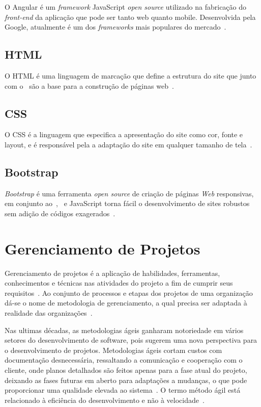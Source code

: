 O Angular é um \textit{framework} JavaScript \textit{open source} utilizado na fabricação do \textit{front-end} da aplicação que pode ser tanto web quanto mobile. 
Desenvolvida pela Google, atualmente é um dos \textit{frameworks} mais populares do mercado~\citep{costa2017email}.

\subsection{HTML}\label{html}
\indent

O \acf{HTML} é uma linguagem de marcação que define a estrutura do site que junto com o~ são a base para a construção de páginas web~\citep{w3c}.

\subsection{CSS}\label{css}
\indent

O \acf{CSS} é a linguagem que especifica a apresentação do site como cor, fonte e layout, e é responsável pela a adaptação do site em qualquer tamanho de tela~\citep{w3c}.

\subsection{Bootstrap}\label{bootstrap}
\indent

\textit{Bootstrap} é uma ferramenta \textit{open source} de criação de páginas \textit{Web} responsivas, em conjunto ao~,~ e JavaScript torna fácil o desenvolvimento de sites robustos sem adição de códigos exagerados~\citep{2013bootstrap}.


\section{Gerenciamento de Projetos}\label{GerProj}
\indent

Gerenciamento de projetos é a aplicação de habilidades, ferramentas, conhecimentos e técnicas nas atividades do projeto a fim de cumprir seus requisitos~\citep{pmbok}. 
Ao conjunto de processos e etapas dos projetos de uma organização dá-se o nome de metodologia de gerenciamento, a qual precisa ser adaptada à realidade das organizações~\citep{xavier2005metodologia}.

Nas ultimas décadas, as metodologias ágeis ganharam notoriedade em vários setores do desenvolvimento de software, pois sugerem uma nova perspectiva para o desenvolvimento de projetos.
Metodologias ágeis cortam custos com documentação desnecessária, ressaltando a comunicação e cooperação com o cliente, onde planos detalhados são feitos apenas para a fase atual do projeto, deixando as fases futuras em aberto para adaptações a mudanças, o que pode proporcionar uma qualidade elevada ao sistema~\citep{sato2007uso}.
O termo método ágil está relacionado à eficiência do desenvolvimento e não à velocidade~\citep{prikladnicki2014metodos}.

